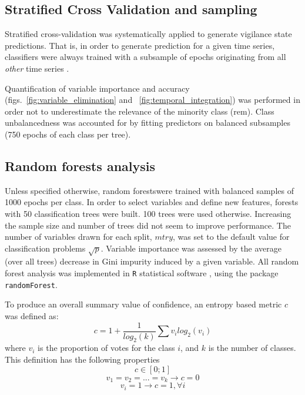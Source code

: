 \subsection{Stratified Cross Validation and sampling}


Stratified cross-validation was systematically applied to generate vigilance state predictions.
That is, in order to generate prediction for a given time series, classifiers were always trained with a subsample of epochs
originating from all \emph{other} time series \cite{ding_querying_2008}.

Quantification of variable importance and accuracy (figs.~\ref{fig:variable_elimination} and ~\ref{fig:temporal_integration}) was performed in order 
not to underestimate the relevance of the minority class
(\gls{rem})\cite{boulesteix_overview_2012}.
Class  unbalancedness was accounted for by fitting predictors on balanced subsamples (750 epochs of each class per tree).


\subsection{Random forests analysis}
Unless specified otherwise, random forests\cite{breiman_random_2001}were trained
with balanced samples of 1000 epochs per class.
In order to select variables and define new features, forests with 50 classification trees were built.
100 trees were used otherwise.
Increasing the sample size and number of trees did not seem to improve performance.
The number of variables drawn for each split, $mtry$, was set to the default value for classification problems $\sqrt{p}$.
Variable importance was assessed by the average (over all trees) decrease in Gini impurity induced by a given variable.
All random forest analysis was implemented in \texttt{R} statistical software
\cite{r_core_team_r:_2014}, using the package
\texttt{randomForest}\cite{liaw_classification_2002}.

To produce an overall summary value of confidence, an entropy based metric $c$ was defined as:
\begin{equation}
c = 1 + \frac{1}{log_2(k)}\sum{v_i  log_2(v_i)}
\label{eq:entropy}
\end{equation}
where $v_i$ is the proportion of votes for the class $i$, and $k$ is the number of classes. 
This definition has the following properties 
\[
c \in [0;1]
\]
\[
v_1 = v_2 = ... = v_k \rightarrow c = 0
\]
\[
v_i = 1 \rightarrow c = 1 , \forall i
\]




